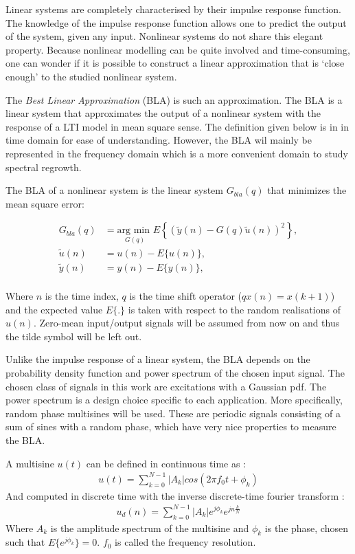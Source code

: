 	Linear systems are completely characterised by their impulse response function. The knowledge of the impulse response function allows one to predict the output of the system, given any input. Nonlinear systems do not share this elegant property. Because nonlinear modelling can be quite involved and time-consuming, one can wonder if it is possible to construct a linear approximation that is `close enough' to the studied nonlinear system.

	The \emph{Best Linear Approximation} (BLA) is such an approximation. The BLA is a linear system that approximates the output of a nonlinear system with the response of a LTI model in mean square sense. The definition given below is in in time domain for ease of understanding. However, the BLA wil mainly be represented in the frequency domain which is a more convenient domain to study spectral regrowth.

	\begin{definition}
		The BLA of a nonlinear system is the linear system $G_{bla}(q)$ that minimizes the mean square error:
		
		\begin{align*}
		   G_{bla}(q) &= \underset{G(q)}{\text{arg min }} E \left\{ \left( \tilde{y}(n) - G(q)\tilde{u}(n)\right)^2 \right\}, \\
		   \tilde{u}(n) &= u(n) - E\{u(n)\},\\
		   \tilde{y}(n) &= y(n) - E\{y(n)\},\\
		\end{align*}

		Where $n$ is the time index, $q$ is the time shift operator ($qx(n) = x(k+1)$) and the expected value $E\{.\}$ is taken with respect to the random realisations of $u(n)$. Zero-mean input/output signals will be assumed from now on and thus the tilde symbol will be left out.
	\end{definition}

 Unlike the impulse response of a linear system, the BLA depends on the probability density function and power spectrum of the chosen input signal. The chosen class of signals in this work are excitations with a Gaussian pdf. The power spectrum is a design choice specific to each application. More specifically, random phase multisines will be used. These are periodic signals consisting of a sum of sines with a random phase, which have very nice properties to measure the BLA.
	\begin{definition}
	A multisine $u(t)$ can be defined in continuous time as : 
	\begin{align}
		u(t) = \sum^{N-1}_{k = 0}| A_k| cos(2\pi f_0t + \phi_k)
	\end{align}
	And computed in discrete time with the inverse discrete-time fourier transform :
	\begin{align}
		u_d(n) = \sum^{N-1}_{k = 0} |A_k| e^{j\phi_k} e^{jn\frac{k}{N}}
	\end{align}
		Where $A_k$ is the amplitude spectrum of the multisine and $\phi_k$ is the phase, chosen such that $E\{e^{j\phi_k}\} = 0$. $f_0$ is called the frequency resolution.
	\end{definition}
	
